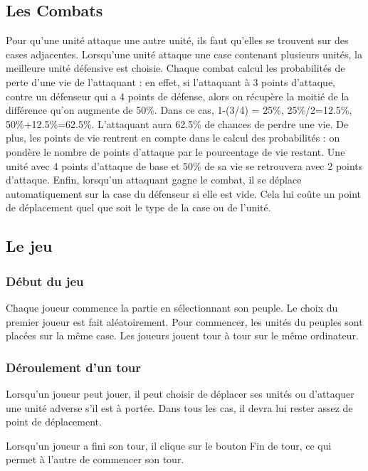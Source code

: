 \subsection{Les Combats}
Pour qu'une unité attaque une autre unité, ils faut qu'elles se trouvent sur des cases adjacentes. Lorsqu'une unité attaque une case contenant plusieurs unités, la meilleure unité défensive est choisie. Chaque combat calcul les probabilités de perte d'une vie de l'attaquant : en effet, si l'attaquant à 3 points d'attaque, contre un défenseur qui a 4 points de défense, alors on récupère la moitié de la différence qu'on augmente de 50\%. Dans ce cas, 1-(3/4) = 25\%, 25\%/2=12.5\%, 50\%+12.5\%=62.5\%. L'attaquant aura 62.5\% de chances de perdre une vie.\newline
De plus, les points de vie rentrent en compte dans le calcul des probabilités : on pondère le nombre de points d'attaque par le pourcentage de vie restant. Une unité avec 4 points d'attaque de base et 50\% de sa vie se retrouvera avec 2 points d'attaque.\newline
Enfin, lorsqu'un attaquant gagne le combat, il se déplace automatiquement sur la case du défenseur si elle est vide. Cela lui coûte un point de déplacement quel que soit le type de la case ou de l'unité.

\subsection{Le jeu}
\subsubsection{Début du jeu}
Chaque joueur commence la partie en sélectionnant son peuple. Le choix du premier joueur est fait aléatoirement. Pour commencer, les unités du peuples sont placées sur la même case. Les joueurs jouent tour à tour sur le même ordinateur.
\subsubsection{Déroulement d'un tour}
Lorsqu'un joueur peut jouer, il peut choisir de déplacer ses unités ou d'attaquer une unité adverse s'il est à portée. Dans tous les cas, il devra lui rester assez de point de déplacement.

Lorsqu'un joueur a fini son tour, il clique sur le bouton Fin de tour, ce qui permet à l'autre de commencer son tour.
